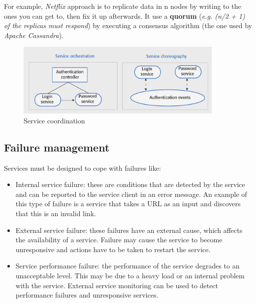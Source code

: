 \documentclass[10pt,a4paper]{report}
\begin{document}
For example, \textit{Netflix} approach is to replicate data in n nodes by writing to the ones you can get to, then fix it up afterwards. It use a \textbf{quorum} (\textit{e.g. (n/2 + 1) of the replicas must respond}) by executing a consensus algorithm (the one used by \textit{Apache Cassandra}).
\begin{figure}[h]
	\centering
	\includegraphics[width=0.9\textwidth]{image63}
	\caption{Service coordination}
	\label{image63}
\end{figure} 



\subsection{Failure management}
Services must be designed to cope with failures like:
\begin{itemize}
	\item Internal service failure: these are conditions that are detected by the service and can be reported to the
	service client in an error message. An example of this type of failure is a service
	that takes a URL as an input and discovers that this is an invalid link.
	\item External service failure: these failures have an external cause, which affects the availability of a service.
	Failure may cause the service to become unresponsive and actions have to be
	taken to restart the service.
	\item Service performance failure: the performance of the service degrades to an unacceptable level. This may be
	due to a heavy load or an internal problem with the service. External service
	monitoring can be used to detect performance failures and unresponsive
	services.
\end{itemize}
\end{document}
